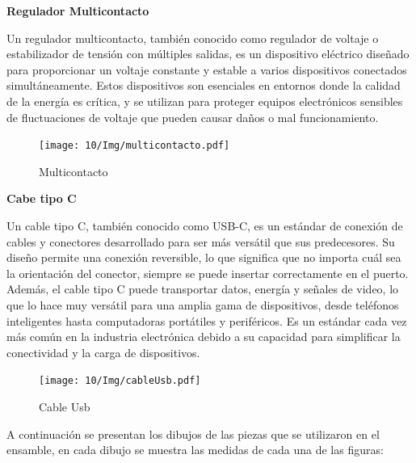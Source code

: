 \textbf{Regulador Multicontacto}

Un regulador multicontacto, también conocido como regulador de voltaje o estabilizador de tensión con múltiples salidas, es un dispositivo eléctrico diseñado para proporcionar un voltaje constante y estable a varios dispositivos conectados simultáneamente. Estos dispositivos son esenciales en entornos donde la calidad de la energía es crítica, y se utilizan para proteger equipos electrónicos sensibles de fluctuaciones de voltaje que pueden causar daños o mal funcionamiento.

 \begin{figure}[H]
        \centering
        \texttt{[image: 10/Img/multicontacto.pdf]}
        \caption{Multicontacto}
        \label{Multicontacto}
\end{figure}

\textbf{Cabe tipo C}

Un cable tipo C, también conocido como USB-C, es un estándar de conexión de cables y conectores desarrollado para ser más versátil que sus predecesores. Su diseño permite una conexión reversible, lo que significa que no importa cuál sea la orientación del conector, siempre se puede insertar correctamente en el puerto. Además, el cable tipo C puede transportar datos, energía y señales de video, lo que lo hace muy versátil para una amplia gama de dispositivos, desde teléfonos inteligentes hasta computadoras portátiles y periféricos. Es un estándar cada vez más común en la industria electrónica debido a su capacidad para simplificar la conectividad y la carga de dispositivos.

\begin{figure}[H]
        \centering
        \texttt{[image: 10/Img/cableUsb.pdf]}
        \caption{Cable Usb}
        \label{Cable usb}
    \end{figure}
    
A continuación se presentan los dibujos de las
piezas que se utilizaron en el ensamble, en cada dibujo se muestra las medidas de cada una de las figuras:

